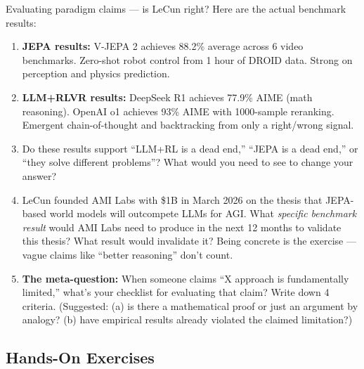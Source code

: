 \begin{thinkfirst}{Evaluating paradigm claims --- is LeCun right?}
Here are the actual benchmark results:

\begin{enumerate}
  \item \textbf{JEPA results:} V-JEPA 2 achieves 88.2\% average across 6 video benchmarks. Zero-shot robot control from 1 hour of DROID data. Strong on perception and physics prediction.

  \item \textbf{LLM+RLVR results:} DeepSeek R1 achieves 77.9\% AIME (math reasoning). OpenAI o1 achieves 93\% AIME with 1000-sample reranking. Emergent chain-of-thought and backtracking from only a right/wrong signal.

  \item Do these results support ``LLM+RL is a dead end,'' ``JEPA is a dead end,'' or ``they solve different problems''? What would you need to see to change your answer?

  \item LeCun founded AMI Labs with \$1B in March 2026 on the thesis that JEPA-based world models will outcompete LLMs for AGI. What \textit{specific benchmark result} would AMI Labs need to produce in the next 12 months to validate this thesis? What result would invalidate it? Being concrete is the exercise --- vague claims like ``better reasoning'' don't count.

  \item \textbf{The meta-question:} When someone claims ``X approach is fundamentally limited,'' what's your checklist for evaluating that claim? Write down 4 criteria. (Suggested: (a) is there a mathematical proof or just an argument by analogy? (b) have empirical results already violated the claimed limitation?)
\end{enumerate}
\end{thinkfirst}

\subsection*{Hands-On Exercises}

